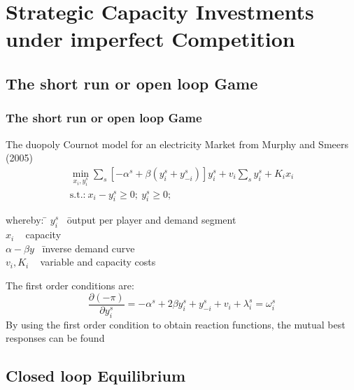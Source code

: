 \section{Strategic Capacity Investments under imperfect Competition}

\subsection{The short run or open loop Game}

					\begin{frame}
					
\frametitle{The short run or open loop Game}

The duopoly Cournot model for an electricity Market from Murphy and Smeers (2005)
\begin{gather}
	\min_{x_i,y_i^s} \sum_s \left[ - \alpha^s + \beta (y_i^s+y_{-i}^s) \right] y_i^s + v_i \sum_s y_i^s + K_i x_i \\
\text{s.t.:} \  x_i-y_i^s \geq 0; \  y_i^s \geq 0; \ \nonumber
\end{gather}
{\small
\begin{tabbing}
whereby: \= $y_i^s$ \  \= output per player and demand segment \\
\> $x_i$   \    \> capacity  \\
\> $\alpha - \beta y$    \   \= inverse demand curve \\
\> $v_i, K_i$    \    \> variable and capacity costs
\end{tabbing}}
The first order conditions are:
\begin{equation}
	\frac{\partial (- \pi)}{\partial y_i^s} = -\alpha^s + 2 \beta y_i^s +  y_{-i}^s + v_i + \lambda_i^s = \omega_i^s 
\end{equation}
By using the first order condition to obtain reaction functions, the mutual best responses can be found
					\end{frame}


\subsection{Closed loop Equilibrium}


